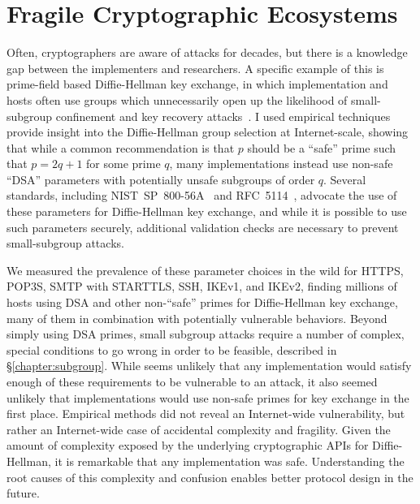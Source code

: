 \section{Fragile Cryptographic Ecosystems}

Often, cryptographers are aware of attacks for decades, but there is a
knowledge gap between the implementers and researchers. A specific example of
this is prime-field based Diffie-Hellman key exchange, in which
implementation and hosts often use groups which unnecessarily open up the
likelihood of small-subgroup confinement and key recovery
attacks~\cite{subgroup-2017}. I used empirical techniques provide insight
into the Diffie-Hellman group selection at Internet-scale, showing that while
a common recommendation is that $p$ should be a ``safe'' prime such that $p =
2q+1$ for some prime $q$, many implementations instead use non-safe ``DSA''
parameters with potentially unsafe subgroups of order $q$. Several standards,
including NIST~SP~800-56A~\cite{sp800} and RFC~5114~\cite{rfc5114}, advocate
the use of these parameters for Diffie-Hellman key exchange, and while it is
possible to use such parameters securely, additional validation checks are
necessary to prevent small-subgroup attacks.

We measured the prevalence of these parameter choices in the wild for HTTPS,
POP3S, SMTP with STARTTLS, SSH, IKEv1, and IKEv2, finding millions of hosts
using DSA and other non-``safe'' primes for Diffie-Hellman key exchange, many
of them in combination with potentially vulnerable behaviors. Beyond simply
using DSA primes, small subgroup attacks require a number of complex, special
conditions to go wrong in order to be feasible, described in
\S\ref{chapter:subgroup}. While seems unlikely that any implementation would
satisfy enough of these requirements to be vulnerable to an attack, it also
seemed unlikely that implementations would use non-safe primes for key
exchange in the first place. Empirical methods did not reveal an
Internet-wide vulnerability, but rather an Internet-wide case of accidental
complexity and fragility. Given the amount of complexity exposed by the
underlying cryptographic APIs for Diffie-Hellman, it is remarkable that any
implementation was safe. Understanding the root causes of this complexity and
confusion enables better protocol design in the future.


% 
% 

